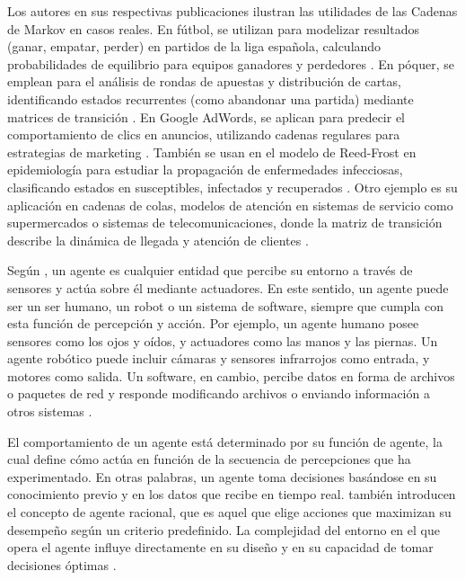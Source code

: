 Los autores en sus respectivas publicaciones ilustran las utilidades de las Cadenas de Markov en casos reales. En fútbol, se utilizan para modelizar resultados (ganar, empatar, perder) en partidos de la liga española, calculando probabilidades de equilibrio para equipos ganadores y perdedores \cite[p. 33-41]{matas_introduccion_2024}. En póquer, se emplean para el análisis de rondas de apuestas y distribución de cartas, identificando estados recurrentes (como abandonar una partida) mediante matrices de transición \cite[p. 42-48]{matas_introduccion_2024}. En Google AdWords, se aplican para predecir el comportamiento de clics en anuncios, utilizando cadenas regulares para estrategias de marketing \cite[p. 49-53]{matas_introduccion_2024}. También se usan en el modelo de Reed-Frost en epidemiología para estudiar la propagación de enfermedades infecciosas, clasificando estados en susceptibles, infectados y recuperados \cite[p. 91-107]{bobadilla_cadenas_2010}. Otro ejemplo es su aplicación en cadenas de colas, modelos de atención en sistemas de servicio como supermercados o sistemas de telecomunicaciones, donde la matriz de transición describe la dinámica de llegada y atención de clientes  \cite[p. 57-61]{bobadilla_cadenas_2010}.


Según \citeauthor{russell_artificial_2022} \citeyear{russell_artificial_2022}, un agente es cualquier entidad que percibe su entorno a través de sensores y actúa sobre él mediante actuadores. En este sentido, un agente puede ser un ser humano, un robot o un sistema de software, siempre que cumpla con esta función de percepción y acción. Por ejemplo, un agente humano posee sensores como los ojos y oídos, y actuadores como las manos y las piernas. Un agente robótico puede incluir cámaras y sensores infrarrojos como entrada, y motores como salida. Un software, en cambio, percibe datos en forma de archivos o paquetes de red y responde modificando archivos o enviando información a otros sistemas \cite{russell_artificial_2022}.

El comportamiento de un agente está determinado por su función de agente, la cual define cómo actúa en función de la secuencia de percepciones que ha experimentado. En otras palabras, un agente toma decisiones basándose en su conocimiento previo y en los datos que recibe en tiempo real. \citeauthor{russell_artificial_2022} \citeyear{russell_artificial_2022} también introducen el concepto de agente racional, que es aquel que elige acciones que maximizan su desempeño según un criterio predefinido. La complejidad del entorno en el que opera el agente influye directamente en su diseño y en su capacidad de tomar decisiones óptimas \cite{russell_artificial_2022}.

